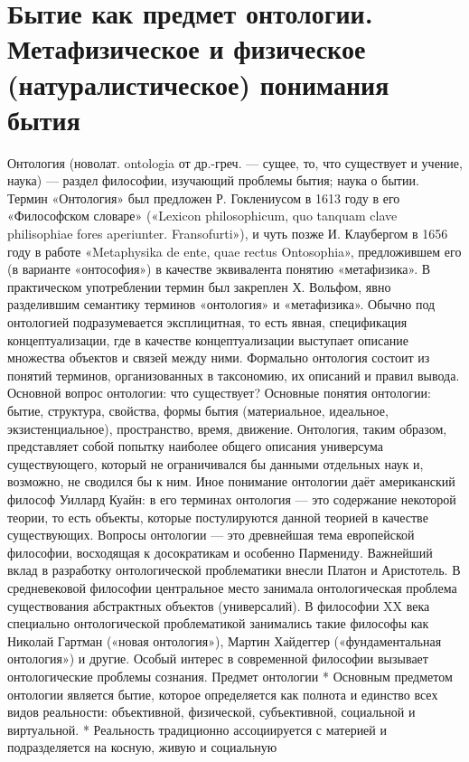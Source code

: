 \documentclass[12pt]{article}
\begin{document}
\section{Бытие как предмет онтологии. Метафизическое и физическое (натуралистическое) понимания бытия}
Онтология (новолат. ontologia от др.-греч. — сущее, то, что существует и учение, наука) — раздел философии,
изучающий проблемы бытия; наука о бытии.
Термин «Онтология» был предложен Р. Гоклениусом в 1613 году в его «Философском словаре» («Lexicon
philosophicum, quo tanquam clave philisophiae fores aperiunter. Fransofurti»), и чуть позже И. Клаубергом в 1656
году в работе «Metaphysika de ente, quae rectus Ontosophia», предложившем его (в варианте «онтософия») в
качестве эквивалента понятию «метафизика». В практическом употреблении термин был закреплен Х.
Вольфом, явно разделившим семантику терминов «онтология» и «метафизика».
Обычно под онтологией подразумевается эксплицитная, то есть явная, спецификация концептуализации, где в
качестве концептуализации выступает описание множества объектов и связей между ними. Формально
онтология состоит из понятий терминов, организованных в таксономию, их описаний и правил вывода.
Основной вопрос онтологии: что существует?
Основные понятия онтологии: бытие, структура, свойства, формы бытия (материальное, идеальное,
экзистенциальное), пространство, время, движение.
Онтология, таким образом, представляет собой попытку наиболее общего описания универсума
существующего, который не ограничивался бы данными отдельных наук и, возможно, не сводился бы к ним.
Иное понимание онтологии даёт американский философ Уиллард Куайн: в его терминах онтология — это
содержание некоторой теории, то есть объекты, которые постулируются данной теорией в качестве
существующих.
Вопросы онтологии — это древнейшая тема европейской философии, восходящая к досократикам и особенно
Пармениду. Важнейший вклад в разработку онтологической проблематики внесли Платон и Аристотель. В
средневековой философии центральное место занимала онтологическая проблема существования абстрактных
объектов (универсалий).
В философии XX века специально онтологической проблематикой занимались такие философы как Николай
Гартман («новая онтология»), Мартин Хайдеггер («фундаментальная онтология») и другие. Особый интерес в
современной философии вызывает онтологические проблемы сознания.
Предмет онтологии
* Основным предметом онтологии является бытие, которое определяется как полнота и единство всех видов
реальности: объективной, физической, субъективной, социальной и виртуальной.
 * Реальность традиционно ассоциируется с материей и подразделяется на косную, живую и социальную
\end{document}

